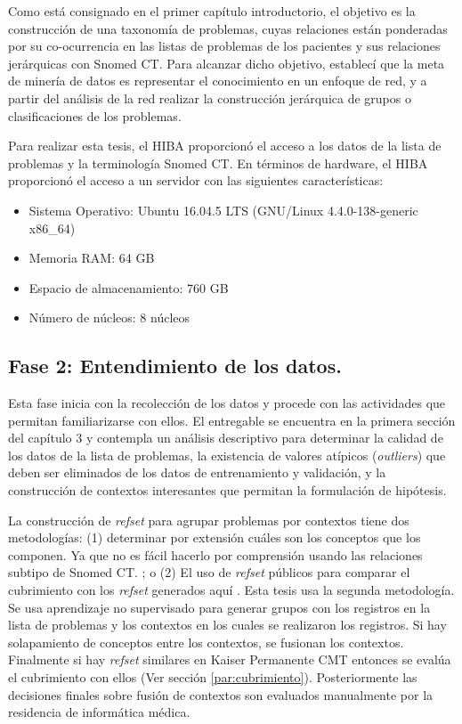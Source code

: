 Como está consignado en el primer capítulo introductorio, el objetivo es la construcción de una taxonomía de problemas, cuyas relaciones están ponderadas por su co-ocurrencia en las listas de problemas de los pacientes y sus relaciones jerárquicas con Snomed CT. Para alcanzar dicho objetivo, establecí que la meta de minería de datos es representar el conocimiento en un enfoque de red, y a partir del análisis de la red realizar la construcción jerárquica de grupos o clasificaciones de los problemas.

Para realizar esta tesis, el \acrshort{HIBA} proporcionó el acceso a los datos de la lista de problemas y la terminología Snomed CT. En términos de hardware, el \acrshort{HIBA} proporcionó el acceso a un servidor con las siguientes características:
\begin{itemize}
\item Sistema Operativo: Ubuntu 16.04.5 LTS (GNU/Linux 4.4.0-138-generic x86\_64)
\item Memoria RAM: 64 GB 
\item Espacio de almacenamiento: 760 GB
\item Número de núcleos: 8 núcleos
\end{itemize}

\subsection{Fase 2: Entendimiento de los datos.} \label{par:entendimiento_datos} Esta fase inicia con la recolección de los datos y procede con las actividades que permitan familiarizarse con ellos. El entregable se encuentra en la primera sección del capítulo 3 y contempla un análisis descriptivo para determinar la calidad de los datos de la lista de problemas, la existencia de valores atípicos (\textit{outliers})  que deben ser eliminados de los datos de entrenamiento y validación, y la construcción de contextos interesantes que permitan la formulación de hipótesis.

La construcción de  \textit{\acrshort{refset}} para agrupar problemas por contextos tiene dos metodologías: (1) determinar por extensión cuáles son los conceptos que los componen. Ya que no es fácil hacerlo por comprensión usando las relaciones subtipo de Snomed CT.  \cite{Hjen2014MethodsSets.,Lee2013AImplementations.}; o (2) El uso de \textit{\acrshort{refset}} públicos para comparar el cubrimiento  con los \textit{\acrshort{refset}} generados aquí \cite{Lee2013AImplementations.}. Esta tesis usa la segunda metodología. Se usa aprendizaje no supervisado para generar grupos con los registros en la lista de problemas y los contextos en los cuales se realizaron los registros.  Si hay solapamiento de conceptos entre los contextos, se fusionan los contextos. Finalmente si hay \textit{\acrshort{refset}} similares en Kaiser Permanente \acrshort{CMT} entonces se evalúa el cubrimiento con ellos (Ver sección \ref{par:cubrimiento}).  Posteriormente las decisiones finales sobre fusión de  contextos son evaluados manualmente por la residencia de informática médica.  

